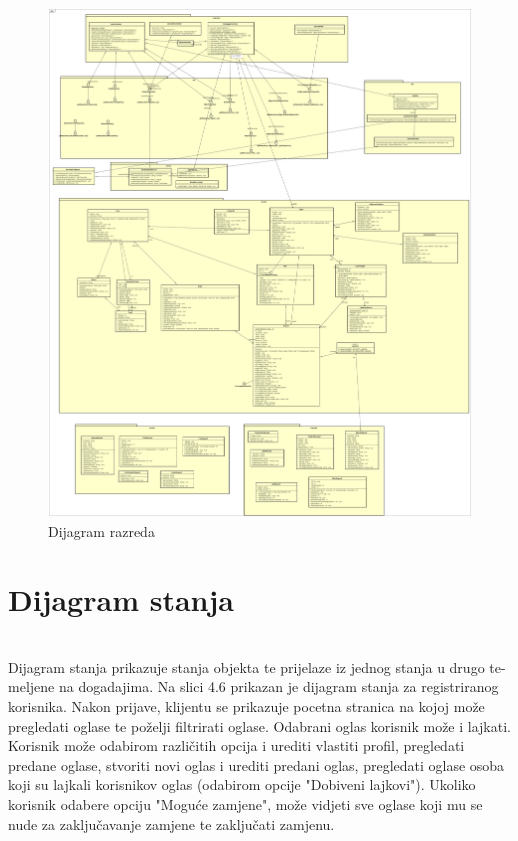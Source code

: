 		\begin{figure}[H]
			\includegraphics[scale=0.15]{slike/dijag_raz.png} 
			\centering
			\caption{Dijagram razreda}
			\label{fig:models}
		\end{figure}
		
		\eject
			
			\section{Dijagram stanja}
			
				\textbf{\textit{}}\\
			
Dijagram stanja prikazuje stanja objekta te prijelaze iz jednog stanja u drugo te-
meljene na dogadajima. Na slici 4.6 prikazan je dijagram stanja za registriranog
korisnika. Nakon prijave, klijentu se prikazuje pocetna stranica na kojoj može pregledati oglase te poželji filtrirati oglase.
Odabrani oglas korisnik može i lajkati. Korisnik može odabirom različitih opcija i urediti vlastiti profil, pregledati predane oglase, stvoriti novi oglas i urediti predani oglas, pregledati oglase osoba koji su lajkali korisnikov oglas (odabirom opcije "Dobiveni lajkovi"). Ukoliko korisnik odabere opciju "Moguće zamjene", može vidjeti sve oglase koji mu se nude za zaključavanje zamjene te zaključati zamjenu.

